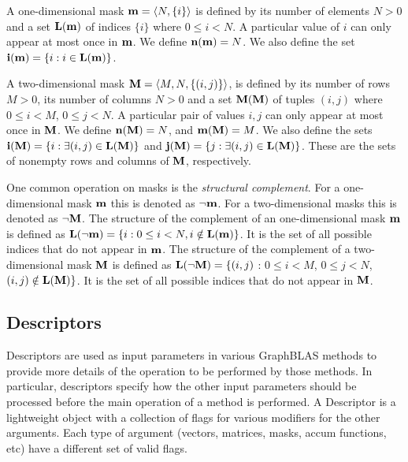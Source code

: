 A one-dimensional mask ${\bf m} = \langle N, \{ i \} \rangle$
is defined by its number of elements $N>0$ and a set $\bold{L}({\bf m})$ of indices $\{ i \}$ 
where $0 \leq i < N$.  A particular value of $i$ can only
appear at most once in ${\bf m}$. We define $\bold{n}({\bf m}) = N$. 
We also define the set
${\bf i({\bf m})} = \{ i : i \in \bold{L}({\bf m}) \}$.

A two-dimensional mask ${\bf M} = \langle M, N, \{ (i,j) \} \rangle$,
is defined by its number of rows $M>0$, its number of columns
$N>0$ and a set $\bold{M}({\bf M})$ of tuples $(i,j)$ where $0 \leq i < M$, $0 \leq
j < N$.   A particular pair of values $i,j$ can only
appear at most once in ${\bf M}$.  We define $\bold{n}({\bf M})
= N$, and $\bold{m}({\bf M}) = M$.  
We also define the sets ${\bf i({\bf M})} = \{
i : \exists (i,j) \in \bold{L}({\bf M}) \}$ and ${\bf j({\bf M})}
= \{ j : \exists (i,j) \in \bold{L}({\bf M}) \}$.  These are the sets
of nonempty rows and columns of ${\bf M}$, respectively.

One common operation on masks is the \emph{structural complement}.  For a one-dimensional mask ${\bf m}$ this
is denoted as $\neg{\bf m}$. For a two-dimensional
masks this is denoted as $\neg{\bf M}$.
The structure of the complement of an one-dimensional mask ${\bf m}$ is
defined as $\bold{L}(\neg{\bf m}) = \{i : 0 \leq i < N, i \notin \bold{L}({\bf m}) \}$.
It is the set of all possible indices that do not appear in ${\bf m}$.
The structure of the complement of a two-dimensional mask ${\bf M}$ is
defined as $\bold{L}(\neg{\bf M}) = \{(i,j)$ : $0 \leq i < M$, $0 \leq
j < N$, $(i,j) \notin \bold{L}({\bf M}) \}$.  It is the set of all possible
indices that do not appear in ${\bf M}$.

\subsection{Descriptors}


Descriptors are used as input parameters in various GraphBLAS methods to
provide more details of the operation to be performed by those methods.
In particular, descriptors specify how the other input parameters
should be processed before the main operation of a method is performed.
A Descriptor is a lightweight object with a collection of flags
for various modifiers for the other arguments.  Each type of argument
(vectors, matrices, masks, accum functions, etc) have a different set of
valid flags.

